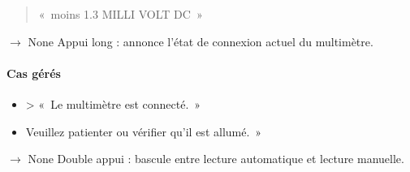 \documentclass[letterpaper,10pt,french]{sphinxmanual}
\begin{document}
\begin{fulllineitems}
\begin{fulllineitems}
\begin{quote}
\sphinxAtStartPar
« moins 1.3 MILLI VOLT DC »
\end{quote}

\end{fulllineitems}


\begin{fulllineitems}
\label{\detokenize{api/modes:modes.mode_multimeter.ModeMultimetre.on_long_press}}
\pysigstartsignatures
\pysiglinewithargsret
{}
{}
{{ $\rightarrow$ None}}
\pysigstopsignatures
\sphinxAtStartPar
Appui long : annonce l’état de connexion actuel du multimètre.


\paragraph{Cas gérés}
\label{\detokenize{api/modes:cas-geres}}\begin{itemize}
\item {} \begin{description}
\sphinxAtStartPar
\sphinxhyphen{}\textgreater{} « Le multimètre est connecté. »

\end{description}

\item {} \begin{description}
\begin{description}
\sphinxAtStartPar
Veuillez patienter ou vérifier qu’il est allumé. »

\end{description}

\end{description}

\end{itemize}

\end{fulllineitems}


\begin{fulllineitems}
\label{\detokenize{api/modes:modes.mode_multimeter.ModeMultimetre.on_double_press}}
\pysigstartsignatures
\pysiglinewithargsret
{}
{}
{{ $\rightarrow$ None}}
\pysigstopsignatures
\sphinxAtStartPar
Double appui : bascule entre lecture automatique et lecture manuelle.



\end{fulllineitems}
\end{fulllineitems}
\end{document}
